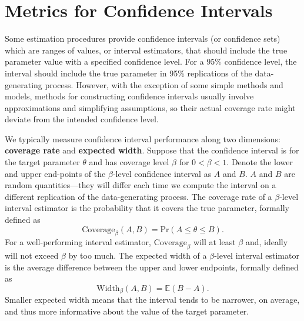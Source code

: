 \documentclass[
]{book}
\newcommand{\Prob}{\text{Pr}}
\newcommand{\E}{\mathbb{E}}
\begin{document}
\section{Metrics for Confidence Intervals}\label{metrics-for-confidence-intervals}

Some estimation procedures provide confidence intervals (or confidence sets) which are ranges of values, or interval estimators, that should include the true parameter value with a specified confidence level.
For a 95\% confidence level, the interval should include the true parameter in 95\% replications of the data-generating process.
However, with the exception of some simple methods and models, methods for constructing confidence intervals usually involve approximations and simplifying assumptions, so their actual coverage rate might deviate from the intended confidence level.

We typically measure confidence interval performance along two dimensions: \textbf{coverage rate} and \textbf{expected width}.
Suppose that the confidence interval is for the target parameter \(\theta\) and has coverage level \(\beta\) for \(0 < \beta < 1\).
Denote the lower and upper end-points of the \(\beta\)-level confidence interval as \(A\) and \(B\).
\(A\) and \(B\) are random quantities---they will differ each time we compute the interval on a different replication of the data-generating process.
The coverage rate of a \(\beta\)-level interval estimator is the probability that it covers the true parameter, formally defined as
\[
\text{Coverage}_\beta(A,B) = \Prob(A \leq \theta \leq B).
\label{eq:coverage}
\]
For a well-performing interval estimator, \(\text{Coverage}_\beta\) will at least \(\beta\) and, ideally will not exceed \(\beta\) by too much.
The expected width of a \(\beta\)-level interval estimator is the average difference between the upper and lower endpoints, formally defined as
\[
\text{Width}_\beta(A,B) = \E(B - A).
\label{eq:expected-width}
\]
Smaller expected width means that the interval tends to be narrower, on average, and thus more informative about the value of the target parameter.
\end{document}
